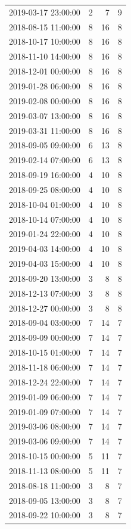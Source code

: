 \begin{tabular}{lrrr}
2019-03-17 23:00:00 & 2 & 7 & 9 \\
2018-08-15 11:00:00 & 8 & 16 & 8 \\
2018-10-17 10:00:00 & 8 & 16 & 8 \\
2018-11-10 14:00:00 & 8 & 16 & 8 \\
2018-12-01 00:00:00 & 8 & 16 & 8 \\
2019-01-28 06:00:00 & 8 & 16 & 8 \\
2019-02-08 00:00:00 & 8 & 16 & 8 \\
2019-03-07 13:00:00 & 8 & 16 & 8 \\
2019-03-31 11:00:00 & 8 & 16 & 8 \\
2018-09-05 09:00:00 & 6 & 13 & 8 \\
2019-02-14 07:00:00 & 6 & 13 & 8 \\
2018-09-19 16:00:00 & 4 & 10 & 8 \\
2018-09-25 08:00:00 & 4 & 10 & 8 \\
2018-10-04 01:00:00 & 4 & 10 & 8 \\
2018-10-14 07:00:00 & 4 & 10 & 8 \\
2019-01-24 22:00:00 & 4 & 10 & 8 \\
2019-04-03 14:00:00 & 4 & 10 & 8 \\
2019-04-03 15:00:00 & 4 & 10 & 8 \\
2018-09-20 13:00:00 & 3 & 8 & 8 \\
2018-12-13 07:00:00 & 3 & 8 & 8 \\
2018-12-27 00:00:00 & 3 & 8 & 8 \\
2018-09-04 03:00:00 & 7 & 14 & 7 \\
2018-09-09 00:00:00 & 7 & 14 & 7 \\
2018-10-15 01:00:00 & 7 & 14 & 7 \\
2018-11-18 06:00:00 & 7 & 14 & 7 \\
2018-12-24 22:00:00 & 7 & 14 & 7 \\
2019-01-09 06:00:00 & 7 & 14 & 7 \\
2019-01-09 07:00:00 & 7 & 14 & 7 \\
2019-03-06 08:00:00 & 7 & 14 & 7 \\
2019-03-06 09:00:00 & 7 & 14 & 7 \\
2018-10-15 00:00:00 & 5 & 11 & 7 \\
2018-11-13 08:00:00 & 5 & 11 & 7 \\
2018-08-18 11:00:00 & 3 & 8 & 7 \\
2018-09-05 13:00:00 & 3 & 8 & 7 \\
2018-09-22 10:00:00 & 3 & 8 & 7 \\

\end{tabular}
